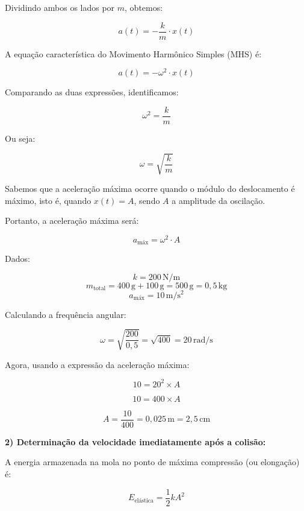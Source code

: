 \documentclass[a4paper,12pt]{article}
\begin{document}
\begin{flushleft}
Dividindo ambos os lados por $m$, obtemos:

\begin{equation}
a(t) = -\frac{k}{m} \cdot x(t)
\end{equation}

A \colorbox{yellow!30}{equação característica do Movimento Harmônico Simples (MHS) é}:

\begin{equation}
a(t) = -\omega^2 \cdot x(t)
\end{equation}

Comparando as duas expressões, identificamos:

\begin{equation}
\omega^2 = \frac{k}{m}
\end{equation}

Ou seja:

\begin{equation}
\omega = \sqrt{\frac{k}{m}}
\end{equation}

Sabemos que a aceleração máxima ocorre quando o módulo do deslocamento é máximo, isto é, quando $x(t) = A$, sendo $A$ a amplitude da oscilação.

Portanto, a aceleração máxima será:

\begin{equation}
a_{\text{máx}} = \omega^2 \cdot A
\end{equation}

Dados:

\[
k = 200\,\mathrm{N/m}
\]
\[
m_{\text{total}} = 400\,\mathrm{g} + 100\,\mathrm{g} = 500\,\mathrm{g} = 0{{,}}5\,\mathrm{kg}
\]
\[
a_{\text{máx}} = 10\,\mathrm{m/s^2}
\]

Calculando a frequência angular:

\[
\omega = \sqrt{\frac{200}{0,5}} = \sqrt{400} = 20\,\mathrm{rad/s}
\]

Agora, usando a expressão da aceleração máxima:

\[
10 = 20^2 \times A
\]

\[
10 = 400 \times A
\]

\[
A = \frac{10}{400} = 0{,}025\,\mathrm{m} = 2{,}5\,\mathrm{cm}
\]

\textbf{2) Determinação da velocidade imediatamente após a colisão:}

A energia armazenada na mola no ponto de máxima compressão (ou elongação) é:

\[
\boxed{
E_{\text{elástica}} = \frac{1}{2}kA^2
}
\]


\end{flushleft}
\end{document}

